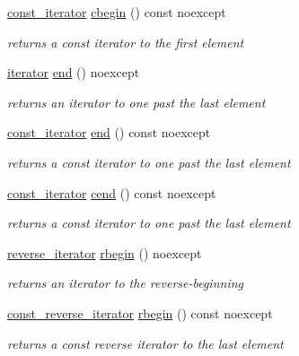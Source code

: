 \begin{DoxyCompactItemize}
\hyperlink{classnlohmann_1_1basic__json_aebd2cfa7e4ded4e97cde9269bfeeea38}{const\+\_\+iterator} \hyperlink{classnlohmann_1_1basic__json_ae508c13e3ad6ce445bcaf24a2bc7d039}{cbegin} () const noexcept
\begin{DoxyCompactList}\small\item\em returns a const iterator to the first element \end{DoxyCompactList}\item 
\hyperlink{classnlohmann_1_1basic__json_aa549b2b382916b3baafb526e5cb410bd}{iterator} \hyperlink{classnlohmann_1_1basic__json_a931267ec3f09eb67e4382f321b2c52bc}{end} () noexcept
\begin{DoxyCompactList}\small\item\em returns an iterator to one past the last element \end{DoxyCompactList}\item 
\hyperlink{classnlohmann_1_1basic__json_aebd2cfa7e4ded4e97cde9269bfeeea38}{const\+\_\+iterator} \hyperlink{classnlohmann_1_1basic__json_a82b5b96f86879a3bac0c713d33178551}{end} () const noexcept
\begin{DoxyCompactList}\small\item\em returns a const iterator to one past the last element \end{DoxyCompactList}\item 
\hyperlink{classnlohmann_1_1basic__json_aebd2cfa7e4ded4e97cde9269bfeeea38}{const\+\_\+iterator} \hyperlink{classnlohmann_1_1basic__json_a3017cf0f1a4673e904e34cfef62e7758}{cend} () const noexcept
\begin{DoxyCompactList}\small\item\em returns a const iterator to one past the last element \end{DoxyCompactList}\item 
\hyperlink{classnlohmann_1_1basic__json_a5b8c0ebedd920b507f4f7ff4e19bf3c6}{reverse\+\_\+iterator} \hyperlink{classnlohmann_1_1basic__json_aff8e38cd973bc94557fa8d36433c0e4c}{rbegin} () noexcept
\begin{DoxyCompactList}\small\item\em returns an iterator to the reverse-\/beginning \end{DoxyCompactList}\item 
\hyperlink{classnlohmann_1_1basic__json_aa7dba16ed9ee97380aeb17a207dd919a}{const\+\_\+reverse\+\_\+iterator} \hyperlink{classnlohmann_1_1basic__json_aab1329f44c8301b7679962726a043549}{rbegin} () const noexcept
\begin{DoxyCompactList}\small\item\em returns a const reverse iterator to the last element \end{DoxyCompactList}\item 

\end{DoxyCompactItemize}
